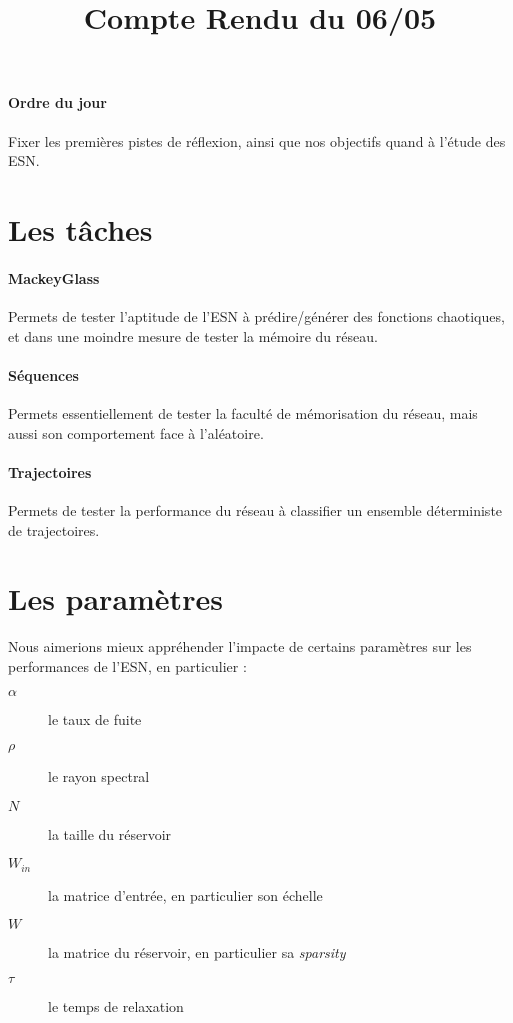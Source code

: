 \documentclass[12pt]{article}
\title{Compte Rendu du 06/05}
\author{}
\date{}
\begin{document}
\maketitle

\paragraph{Ordre du jour}
Fixer les premières pistes de réflexion, ainsi que nos objectifs quand à l'étude des ESN.

\section{Les tâches}
\paragraph{MackeyGlass}
Permets de tester l'aptitude de l'ESN à prédire/générer des fonctions chaotiques, et dans une moindre mesure de tester la mémoire du réseau.
\paragraph{Séquences}
Permets essentiellement de tester la faculté de mémorisation du réseau, mais aussi son comportement face à l'aléatoire.
\paragraph{Trajectoires}
Permets de tester la performance du réseau à classifier un ensemble déterministe de trajectoires.

\section{Les paramètres}
Nous aimerions mieux appréhender l'impacte de certains paramètres sur les performances de l'ESN, en particulier :
\begin{description}
\item[$\alpha$] le taux de fuite
\item[$\rho$] le rayon spectral
\item[$N$] la taille du réservoir
\item[$W_{in}$] la matrice d'entrée, en particulier son échelle
\item[$W$] la matrice du réservoir, en particulier sa \textit{sparsity}
\item[$\tau$] le temps de relaxation
\end{description}
\end{document}
